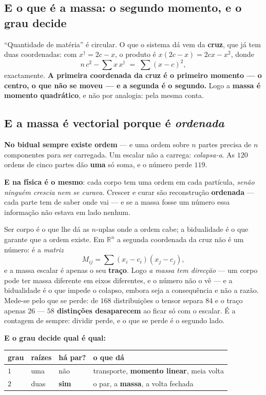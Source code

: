 \documentclass[11pt,a4paper]{article}
\begin{document}
\subsection*{E o que é a massa: o segundo momento, e o grau decide}

``Quantidade de matéria'' é circular. O que o sistema dá vem da \textbf{cruz}, que já tem duas
coordenadas: com $x^{\dagger}=2c-x$, o produto é $x(2c-x)=2cx-x^2$, donde
\[
  n\,c^2 - \textstyle\sum x\,x^{\dagger} \;=\; \sum (x-c)^2 ,
\]
exactamente. \textbf{A primeira coordenada da cruz é o primeiro momento --- o centro, o que não se
moveu --- e a segunda é o segundo.} Logo a \textbf{massa é momento quadrático}, e não por analogia:
pela mesma conta.

\subsection*{E a massa é vectorial porque é \emph{ordenada}}

\textbf{No bidual sempre existe ordem} --- e uma ordem sobre $n$ partes precisa de $n$ componentes
para ser carregada. Um escalar não a carrega: \emph{colapsa-a}. As $120$ ordens de cinco partes dão
\textbf{uma} só soma, e o número perde $119$.

\smallskip
\noindent \textbf{E na física é o mesmo}: cada corpo tem uma ordem em cada partícula, \emph{senão
ninguém crescia nem se curava}. Crescer e curar são reconstrução \textbf{ordenada} --- cada parte tem
de saber onde vai --- e se a massa fosse um número essa informação não estava em lado nenhum.

\smallskip
\noindent Ser corpo é o que lhe dá as $n$-uplas onde a ordem cabe; a bidualidade é o que garante que
a ordem existe. Em $\mathbb{R}^n$ a segunda coordenada da cruz não é um número: é a \emph{matriz}
\[
  M_{ij} = \sum (x_i-c_i)(x_j-c_j) ,
\]
e a massa escalar é apenas o seu \textbf{traço}. Logo \emph{a massa tem direcção} --- um corpo pode
ter massa diferente em eixos diferentes, e o número não o vê --- e a bidualidade é o que impede o
colapso, embora seja a consequência e não a razão. Mede-se pelo que se perde: de $168$
distribuições o tensor separa $84$ e o traço apenas $26$ --- \textbf{$58$ distinções desaparecem} ao
ficar só com o escalar. É a contagem de sempre: dividir perde, e o que se perde é o segundo lado.

\smallskip
\noindent \textbf{E o grau decide qual é qual:}

\begin{center}\small
\begin{tabular}{@{}llll@{}}
\toprule
grau & raízes & há par? & o que dá \\
\midrule
$1$ & uma & não & transporte, \textbf{momento linear}, meia volta \\
$2$ & duas & \textbf{sim} & o par, a \textbf{massa}, a volta fechada \\
\bottomrule
\end{tabular}
\end{center}
\end{document}
